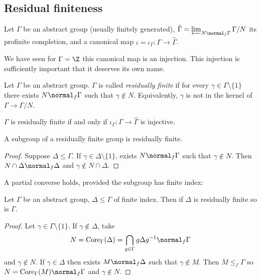 \documentclass[a4paper]{article}
\begin{document}
\subsection{Residual finiteness}

Let \(\Gamma\) be an abstract group (usually finitely generated), \(\hat \Gamma = \varprojlim_{N \normal_f \Gamma} \Gamma/N\) its profinite completion, and a canonical map \(\iota = \iota_\Gamma: \Gamma \to \hat \Gamma\).

We have seen for \(\Gamma = \Z\) this canonical map is an injection. This injection is sufficiently important that it deserves its own name.

\begin{definition}
  Let \(\Gamma\) be an abstract group. \(\Gamma\) is called \emph{residually finite} if for every \(\gamma \in \Gamma \setminus \{1\}\) there exists \(N \normal_f \Gamma\) such that \(\gamma \notin N\). Equivalently, \(\gamma\) is not in the kernel of \(\Gamma \to \Gamma/N\).
\end{definition}

\begin{proposition}
  \(\Gamma\) is residually finite if and only if \(\iota_\Gamma: \Gamma \to \hat \Gamma\) is injective.
\end{proposition}

\begin{proposition}
  A subgroup of a residually finite group is residually finite.
\end{proposition}

\begin{proof}
  Suppose \(\Delta \leq \Gamma\). If \(\gamma \in \Delta \setminus \{1\}\), exists \(N \normal_f \Gamma\) such that \(\gamma \notin N\). Then \(N \cap \Delta \normal_f \Delta\) and \(\gamma \notin N \cap \Delta\).
\end{proof}

A partial converse holds, provided the subgroup has finite index:

\begin{proposition}
  Let \(\Gamma\) be an abstract group, \(\Delta \leq \Gamma\) of finite index. Then if \(\Delta\) is residually finite so is \(\Gamma\).
\end{proposition}

\begin{proof}
  Let \(\gamma \in \Gamma \setminus \{1\}\). If \(\gamma \notin \Delta\), take
  \[
    N = \mathrm{Core}_\Gamma(\Delta) = \bigcap_{g \in \Gamma} g\Delta g^{-1} \normal_f \Gamma
  \]
  and \(\gamma \notin N\). If \(\gamma \in \Delta\) then exists \(M \normal_f \Delta\) such that \(\gamma \notin M\). Then \(M \leq_f \Gamma\) so \(N = \mathrm{Core}_\Gamma(M) \normal_f \Gamma\) and \(\gamma \notin N\).
\end{proof}
\end{document}
